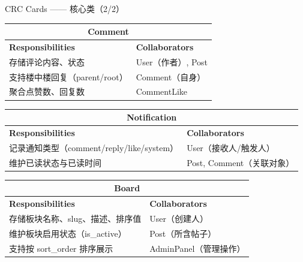 \documentclass[aspectratio=169,UTF8]{ctexbeamer}
\begin{document}
\begin{frame}{CRC Cards —— 核心类（2/2）}
    \small
    \centering
    \begin{tabular}{|p{4.8cm}|p{4.8cm}|}
        \hline
        \multicolumn{2}{|c|}{\textbf{Comment}} \\
        \hline
        \textbf{Responsibilities} & \textbf{Collaborators} \\
        \hline
        存储评论内容、状态 & User（作者）, Post \\
        支持楼中楼回复（parent/root） & Comment（自身） \\
        聚合点赞数、回复数 & CommentLike \\
        \hline
    \end{tabular}
    \vspace{0.3cm}

    \begin{tabular}{|p{4.8cm}|p{4.8cm}|}
        \hline
        \multicolumn{2}{|c|}{\textbf{Notification}} \\
        \hline
        \textbf{Responsibilities} & \textbf{Collaborators} \\
        \hline
        记录通知类型（comment/reply/like/system） & User（接收人/触发人） \\
        维护已读状态与已读时间 & Post, Comment（关联对象） \\
        \hline
    \end{tabular}

    \vspace{0.3cm}

    \begin{tabular}{|p{4.8cm}|p{4.8cm}|}
        \hline
        \multicolumn{2}{|c|}{\textbf{Board}} \\
        \hline
        \textbf{Responsibilities} & \textbf{Collaborators} \\
        \hline
        存储板块名称、slug、描述、排序值 & User（创建人） \\
        维护板块启用状态（is\_active） & Post（所含帖子） \\
        支持按 sort\_order 排序展示 & AdminPanel（管理操作） \\
        \hline
    \end{tabular}
\end{frame}
\end{document}
